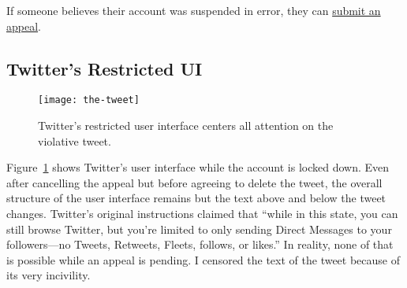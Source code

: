 If someone believes their account was suspended in error, they can
\href{https://web.archive.org/web/20220905021323/https://help.twitter.com/forms/general?subtopic=suspended}{submit
an appeal}.


\subsection{Twitter's Restricted UI}
\label{app:twitter-staging}

\begin{figure}
\centering
\texttt{[image: the-tweet]}
\caption{Twitter's restricted user interface centers all attention on the
violative tweet.}
\label{fig:thetweet}
\end{figure}

Figure~\ref{fig:thetweet} shows Twitter's user interface while the account is
locked down. Even after cancelling the appeal but before agreeing to delete the
tweet, the overall structure of the user interface remains but the text above
and below the tweet changes. Twitter's original instructions claimed that
``while in this state, you can still browse Twitter, but you're limited to only
sending Direct Messages to your followers---no Tweets, Retweets, Fleets,
follows, or likes.'' In reality, none of that is possible while an appeal is
pending. I censored the text of the tweet because of its very incivility.
